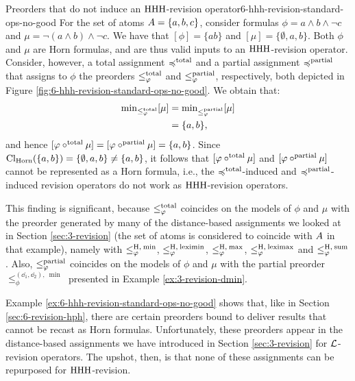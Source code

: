 \begin{xmpl}{Preorders that do not induce an ${\mathrm{HHH}}$-revision operator}{6-hhh-revision-standard-ops-no-good}
	For the set of atoms $A=\{a,b,c\}$,
	consider formulas $\phi=a\land b\land\lnot c$
	and $\mu=\lnot (a\land b)\land\lnot c$.
	We have that $[\phi]=\{ab\}$ and
	$[\mu]=\{\emptyset,a,b\}$.
	Both $\phi$ and $\mu$ are Horn formulas,
	and are thus valid inputs to an ${\mathrm{HHH}}$-revision operator.
	Consider, however, a total assignment $\preccurlyeq^{\mathrm{total}}$
	and a partial assignment $\preccurlyeq^{\mathrm{partial}}$
	that assigns to $\phi$ 
	the preorders
	$\le^{\mathrm{total}}_{\varphi}$ and  $\le^{\mathrm{partial}}_{\varphi}$,
	respectively,
	both depicted in Figure \ref{fig:6-hhh-revision-standard-ops-no-good}.
	We obtain that:
	\begin{align*}
		{\operatorname{min}}_{\le^{\mathrm{total}}_{\varphi}}[\mu] &={\operatorname{min}}_{\le^{\mathrm{partial}}_{\varphi}}[\mu]\\
											&= \{a,b\},	
	\end{align*}
	and hence $[\varphi\circ^{\mathrm{total}}\mu]=[\varphi\circ^{\mathrm{partial}}\mu]=\{a,b\}$.
	Since ${\operatorname{Cl}}_{\mathrm{Horn}}(\{a,b\})=\{\emptyset,a,b\}\neq\{a,b\}$,
	it follows that 
	$[\varphi\circ^{\mathrm{total}}\mu]$ and $[\varphi\circ^{\mathrm{partial}}\mu]$ 
	cannot be represented as a Horn formula,
	i.e., the $\preccurlyeq^{\mathrm{total}}$-induced and $\preccurlyeq^{\mathrm{partial}}$-induced
	revision operators do not work as 
	${\mathrm{HHH}}$-revision operators.

	This finding is significant,
	because $\le^{\mathrm{total}}_{\varphi}$
	coincides on the models of $\phi$ and $\mu$ 
	with the preorder generated 
	by many of the distance-based
	assignments we looked at in Section \ref{sec:3-revision}
	(the set of atoms is considered to coincide with $A$ in that example),
	namely with 
	$\le^{{\operatorname{H}},\:{\operatorname{min}}}_{\varphi}$,
	$\le^{{\operatorname{H}},\:{\operatorname{leximin}}}_{\varphi}$,
	$\le^{{\operatorname{H}},\:{\operatorname{max}}}_{\varphi}$,
	$\le^{{\operatorname{H}},\:{\operatorname{leximax}}}_{\varphi}$
	and
	$\le^{{\operatorname{H}},\:{\operatorname{sum}}}_{\varphi}$.
	Also, $\le^{\mathrm{partial}}_{\varphi}$
	coincides on the models of $\phi$ and $\mu$
	with the partial preorder $\le^{(\dd_{1},\dd_{2}),\:\min}_{\phi}$
	presented in Example \ref{ex:3-revision-dmin}.
\end{xmpl}

Example \ref{ex:6-hhh-revision-standard-ops-no-good}
shows that, like in Section \ref{sec:6-revision-hph},
there are certain preorders bound to deliver results 
that cannot be recast as Horn formulas.
Unfortunately, these preorders appear in
the distance-based assignments we have introduced
in Section \ref{sec:3-revision} for $\mathcal{L}$-revision operators.
The upshot, then, is that none of these assignments
can be repurposed for ${\mathrm{HHH}}$-revision.

